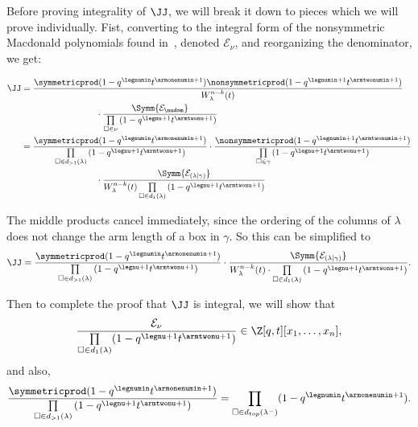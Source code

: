Before proving integrality of $\JJ$, we will break it down to pieces which we will prove individually. Fist, converting to the integral form of the nonsymmetric Macdonald polynomials found in~\cite[Eqn. (6.11)]{MR2348910}, denoted $\mathcal{E}_\nu$, and reorganizing the denominator, we get:

\begin{align*}\JJ &= \frac{\symmetricprod (1-q^{\legnumin}t^{\armonenumin + 1}) \nonsymmetricprod(1-q^{\legnumin + 1}t^{\armtwonumin + 1})}{  W^{n-k}_\lambda(t)} \\ &\hspace*{3cm} \cdot \frac{\Symm{\mathcal{E}_\nudom}}{\prod\limits_{\square \in \nu} \left(1-q^{\legnu+1}t^{\armtwonu +1} \right)} \\
&= \frac{\symmetricprod (1-q^{\legnumin}t^{\armonenumin + 1}) }{  \prod\limits_{\square \in d_{>1}(\lambda)} \left(1-q^{\legnu+1}t^{\armtwonu +1} \right)  } \cdot \frac{\nonsymmetricprod(1-q^{\legnumin + 1}t^{\armtwonumin + 1})}{\prod\limits_{\square \in \gamma} \left(1-q^{\legnu+1}t^{\armtwonu +1} \right)}   \\
&\hspace*{3cm} \cdot  \frac{\Symm{\mathcal{E}_{(\lambda \mid \gamma)}}}{W^{n-k}_\lambda(t)\prod\limits_{\square \in d_1(\lambda)} \left(1-q^{\legnu+1}t^{\armtwonu +1} \right)} \end{align*}

The middle products cancel immediately, since the ordering of the columns of $\lambda$ does not change the arm length of a box in $\gamma$. So this can be simplified to
\begin{equation}\label{simplifiedJ} \JJ = \frac{\symmetricprod (1-q^{\legnumin}t^{\armonenumin + 1}) }{  \prod\limits_{\square \in d_{>1}(\lambda)} \left(1-q^{\legnu+1}t^{\armtwonu +1} \right)  } \cdot  \frac{\Symm{\mathcal{E}_{(\lambda \mid \gamma)}}}{W^{n-k}_\lambda(t)\cdot \prod\limits_{\square \in d_1(\lambda)} \left(1-q^{\legnu+1}t^{\armtwonu +1} \right)}. \end{equation}

Then to complete the proof that $\JJ$ is integral, we will show that
\begin{align}\label{HHLpiece} \frac{\mathcal{E}_\nu}{\prod\limits_{ \square \in d_1(\lambda) }(1-q^{\legnu+1}t^{\armtwonu +1})} \in \Z[q,t][x_1, \dotsc, x_n],\end{align}
and also,
\begin{align}\label{coefficientpiece} \frac{\symmetricprod (1-q^{\legnumin}t^{\armonenumin + 1}) }{  \prod\limits_{\square \in d_{>1}(\lambda)} \left(1-q^{\legnu+1}t^{\armtwonu +1} \right)  } = \prod\limits_{\square \in d_{top}(\lambda^-)} (1-q^\legnumin t^{\armonenumin + 1}). \end{align}


